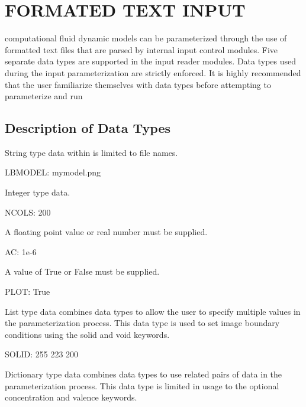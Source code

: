 \documentclass[letterpaper,10pt,english]{sphinxmanual}
\begin{document}
\chapter{FORMATED TEXT INPUT}
\label{\detokenize{index:formated-text-input}}
 computational fluid dynamic models can be parameterized
through the use of formatted text files that are parsed by internal
input control modules. Five separate data types are supported in
the input reader modules. Data types used during the
 input parameterization are strictly enforced. It is highly
recommended that the user familiarize themselves with data types before
attempting to parameterize and run 


\section{Description of Data Types}
\label{\detokenize{index:description-of-data-types}}
 String type data within  is limited to file
names.


LBMODEL: mymodel.png

 Integer type data.


NCOLS: 200

 A floating point value or real number must be supplied.


AC: 1e-6

 A value of True or False must be supplied.


PLOT: True

 List type data combines data types to allow the user to
specify multiple values in the parameterization process. This data type
is used to set image boundary conditions using the solid and void
keywords.


SOLID: 255 223 200

 Dictionary type data combines data types to use related
pairs of data in the parameterization process. This data type is limited
in usage to the optional concentration and valence keywords.
\end{document}

